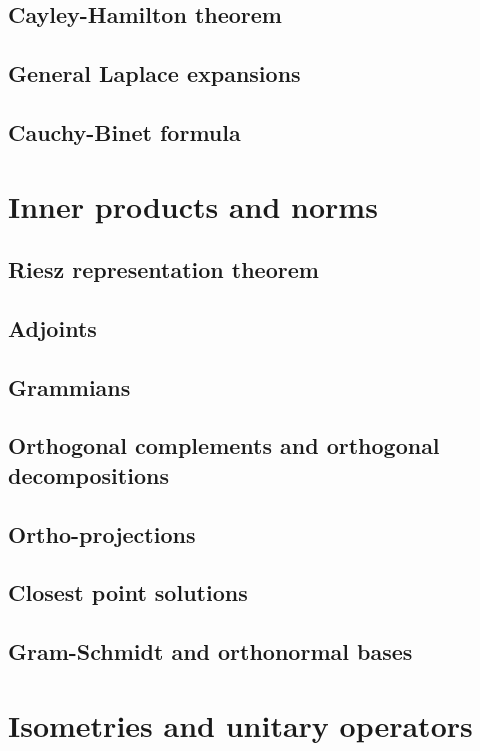 \documentclass{article}
\theoremstyle{definition}
\begin{document}
\subsection{Cayley-Hamilton theorem}
\subsection{General Laplace expansions}
\subsection{Cauchy-Binet formula}

\newpage

\section{Inner products and norms} 
\newpage 
\subsection{Riesz representation theorem}
\subsection{Adjoints}
\subsection{Grammians}
\subsection{Orthogonal complements and orthogonal decompositions}
\subsection{Ortho-projections}
\subsection{Closest point solutions}
\subsection{Gram-Schmidt and orthonormal bases}

\newpage

\section{Isometries and unitary operators}
\newpage 
\end{document}
